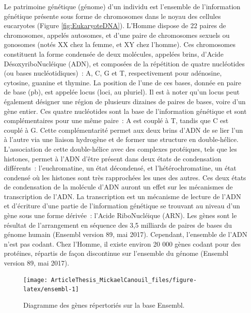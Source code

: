 \documentclass[11pt,a4paper,notrimn]{krantz}
\theoremstyle{definition}
\theoremstyle{definition}
\theoremstyle{remark}
\begin{document}
Le patrimoine génétique (génome) d'un individu est l'ensemble de
l'information génétique présente sous forme de chromosomes dans le noyau
des cellules eucaryotes (Figure \ref{fig:EukaryoteDNA}). L'Homme dispose
de 22 paires de chromosomes, appelés autosomes, et d'une paire de
chromosomes sexuels ou gonosomes (notés XX chez la femme, et XY chez
l'homme). Ces chromosomes constituent la forme condensée de deux
molécules, appelées brins, d'Acide DésoxyriboNucléique (ADN), et
composées de la répétition de quatre nucléotides (ou bases
nucléotidiques)~: A, C, G et T, respectivement pour adénosine, cytosine,
guanine et thymine. La position de l'une de ces bases, donnée en paire
de base (pb), est appelée locus (loci, au pluriel). Il est à noter qu'un
locus peut également désigner une région de plusieurs dizaines de paires
de bases, voire d'un gène entier. Ces quatre nucléotides sont la base de
l'information génétique et sont complémentaires pour une même paire~: A
est couplé à T, tandis que C est couplé à G. Cette complémentarité
permet aux deux brins d'ADN de se lier l'un à l'autre via une liaison
hydrogène et de former une structure en double-hélice. L'association de
cette double-hélice avec des complexes protéiques, tels que les
histones, permet à l'ADN d'être présent dans deux états de condensation
différents~: l'euchromatine, un état décondensé, et l'hétérochromatine,
un état condensé où les histones sont très rapprochées les unes des
autres. Ces deux états de condensation de la molécule d'ADN auront un
effet sur les mécanismes de transcription de l'ADN. La transcription est
un mécanisme de lecture de l'ADN et d'écriture d'une partie de
l'information génétique se trouvant au niveau d'un gène sous une forme
dérivée~: l'Acide RiboNucléique (ARN). Les gènes sont le résultat de
l'arrangement en séquence des 3,5 milliards de paires de bases du génome
humain (Ensembl version 89, mai 2017). Cependant, l'ensemble de l'ADN
n'est pas codant. Chez l'Homme, il existe environ 20 000 gènes codant
pour des protéines, répartis de façon discontinue sur l'ensemble du
génome (Ensembl version 89, mai 2017).



\begin{figure}[!htb]

{\centering \texttt{[image: ArticleThesis\_MickaelCanouil\_files/figure-latex/ensembl-1]} 

}

\caption{Diagramme des gènes répertoriés sur la base Ensembl.}\label{fig:ensembl}
\end{figure}
\end{document}
